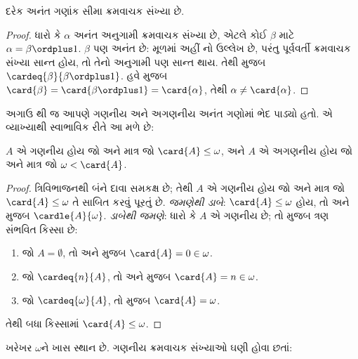 \begin{cor}
દરેક અનંત ગણાંક સીમા ક્રમવાચક સંખ્યા છે.
\end{cor}

\begin{proof}
ધારો કે $\alpha$ અનંત અનુગામી ક્રમવાચક સંખ્યા છે,
એટલે કોઈ $\beta$ માટે $\alpha = \beta
\ordplus 1$. $\beta$ પણ અનંત છે: મૂળમાં અહીં
નો ઉલ્લેખ છે, પરંતુ
પૂર્વવર્તી ક્રમવાચક સંખ્યા સાન્ત હોય, તો તેનો
અનુગામી પણ સાન્ત થાય. તેથી
મુજબ $\cardeq{\beta}{\beta \ordplus 1}$.
હવે 
મુજબ $\card{\beta} = \card{\beta\ordplus 1} =
\card{\alpha}$, તેથી $\alpha \neq \card{\alpha}$.
\end{proof}

અગાઉ થી જ
આપણે ગણનીય અને અગણનીય અનંત
ગણોમાં ભેદ પાડ્યો હતો. એ વ્યાખ્યાથી સ્વાભાવિક રીતે
આ મળે છે:

\begin{prop}
$A$ એ ગણનીય હોય જો અને માત્ર જો
$\card{A} \leq \omega$, અને $A$ એ
અગણનીય હોય જો અને માત્ર જો
$\omega < \card{A}$.
\end{prop}

\begin{proof}
ત્રિવિભાજનથી બંને દાવા સમકક્ષ છે; તેથી
$A$ એ ગણનીય હોય જો અને માત્ર જો
$\card{A} \leq \omega$ તે સાબિત કરવું પૂરતું છે.
\emph{જમણેથી ડાબે}: $\card{A} \leq \omega$ હોય, તો
અને  મુજબ
$\cardle{A}{\omega}$.
\emph{ડાબેથી જમણે}: ધારો કે $A$ એ
ગણનીય છે; તો
 મુજબ
ત્રણ સંભવિત કિસ્સા છે:
\begin{enumerate}
	\item જો $A = \emptyset$, તો
	 અને
	મુજબ $\card{A} = 0 \in \omega$.
	\item જો $\cardeq{n}{A}$, તો
	 અને
	મુજબ $\card{A} = n \in \omega$.
	\item જો $\cardeq{\omega}{A}$, તો
	 મુજબ $\card{A} = \omega$.
\end{enumerate}
તેથી બધા કિસ્સામાં $\card{A} \leq \omega$.
\end{proof}
\noindent
ખરેખર $\omega$ને ખાસ સ્થાન છે. ગણનીય ક્રમવાચક
સંખ્યાઓ ઘણી હોવા છતાં:

